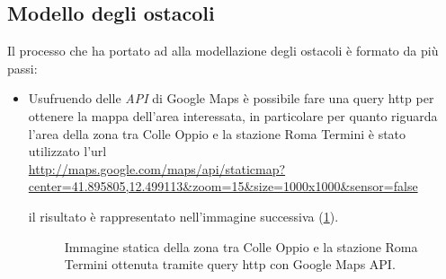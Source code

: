 \subsection{Modello degli ostacoli}
Il processo che ha portato ad alla modellazione degli ostacoli è formato da più passi:
\begin{itemize}
\item Usufruendo delle \emph{API} di Google Maps è possibile fare una query http per ottenere la mappa dell'area interessata, in 
particolare per quanto riguarda l'area della zona tra Colle Oppio e la stazione Roma Termini è stato utilizzato l'url \\
\url{http://maps.google.com/maps/api/staticmap?center=41.895805,12.499113&zoom=15&size=1000x1000&sensor=false}
il risultato è rappresentato nell'immagine successiva (\ref{img:comap}).
\begin{figure}[h]
\centering
\caption{Immagine statica della zona tra Colle Oppio e la stazione Roma Termini ottenuta tramite query http con Google Maps API.}
\label{img:comap}

\end{figure}
\end{itemize}
